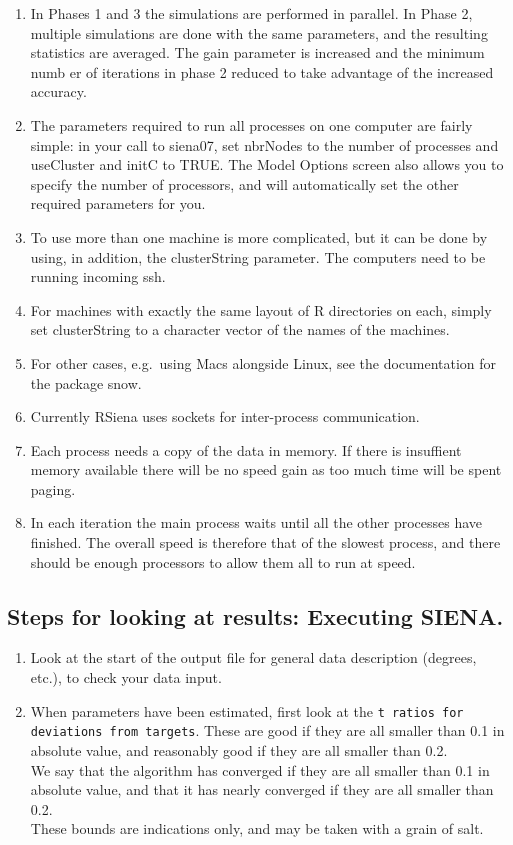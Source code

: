 \documentclass[a4paper,fleqn]{article}
\newcommand{\+}{\, + \,}
\newcommand{\sfn}[1]{\textsf{#1}}
\newcommand{\R}{{\sf R }}
\newcommand{\RS}{{\sf RSiena }}
\newcommand{\si}{{\sf SIENA}}
\begin{document}
{\begin{enumerate}
\item In Phases 1 and 3 the simulations are performed in parallel. In Phase 2,
  multiple simulations are done with the same parameters, and the resulting
  statistics are averaged. The gain parameter is increased and the minimum numb
  er of iterations in phase 2 reduced to take advantage of
  the increased accuracy.

\item The parameters required to run all processes on one computer are fairly
  simple: in your call to \sfn{siena07}, set \sfn{nbrNodes} to the number of
  processes and \sfn{useCluster} and \sfn{initC} to TRUE. The \sfn{Model
    Options} screen also allows you to specify the number of processors, and
  will automatically set the other required parameters for you.

\item To use more than one machine is more complicated, but it can be done by
  using, in addition, the \sfn{clusterString} parameter.  The computers need to
  be running incoming \sfn{ssh}.
\item For machines with exactly the same layout of \R
  directories on each, simply set \sfn{clusterString} to a character vector of
  the names of the machines.
\item For other cases, e.g.\ using Macs alongside Linux,
  see the documentation for the package \sfn{snow}.

\item Currently \RS uses sockets for inter-process communication.
\item Each process needs a copy of the data in memory. If there is insuffient
  memory available there will be no speed gain as too much time will be spent
  paging.
\item In each iteration the main process waits until all the other processes
  have finished. The overall speed is therefore that of the slowest process, and
  there should be enough processors to allow them all to run at speed.
\end{enumerate}
\subsection{Steps for looking at results: Executing \si .}
\label{S_exec}

\begin{enumerate}
\item Look at the start of the output file for general data
      description (degrees, etc.), to check your data input.
    \item When parameters have been estimated, first look at the \texttt{t
        ratios for deviations from targets}.  These are good if they are all
      smaller than 0.1 in absolute
      value, and reasonably good if they are all smaller than 0.2.\\
      We say that the algorithm has converged if they are all smaller than 0.1
      in absolute value, and that it has nearly converged if they are all
      smaller than 0.2.\\
      These bounds are indications only, and may be taken with a grain of
      salt.\\


\end{enumerate}}
\end{document}
